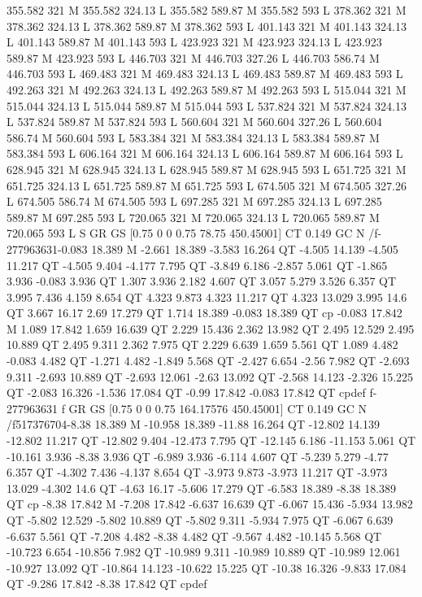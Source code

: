 355.582 321 M
355.582 324.13 L
355.582 589.87 M
355.582 593 L
378.362 321 M
378.362 324.13 L
378.362 589.87 M
378.362 593 L
401.143 321 M
401.143 324.13 L
401.143 589.87 M
401.143 593 L
423.923 321 M
423.923 324.13 L
423.923 589.87 M
423.923 593 L
446.703 321 M
446.703 327.26 L
446.703 586.74 M
446.703 593 L
469.483 321 M
469.483 324.13 L
469.483 589.87 M
469.483 593 L
492.263 321 M
492.263 324.13 L
492.263 589.87 M
492.263 593 L
515.044 321 M
515.044 324.13 L
515.044 589.87 M
515.044 593 L
537.824 321 M
537.824 324.13 L
537.824 589.87 M
537.824 593 L
560.604 321 M
560.604 327.26 L
560.604 586.74 M
560.604 593 L
583.384 321 M
583.384 324.13 L
583.384 589.87 M
583.384 593 L
606.164 321 M
606.164 324.13 L
606.164 589.87 M
606.164 593 L
628.945 321 M
628.945 324.13 L
628.945 589.87 M
628.945 593 L
651.725 321 M
651.725 324.13 L
651.725 589.87 M
651.725 593 L
674.505 321 M
674.505 327.26 L
674.505 586.74 M
674.505 593 L
697.285 321 M
697.285 324.13 L
697.285 589.87 M
697.285 593 L
720.065 321 M
720.065 324.13 L
720.065 589.87 M
720.065 593 L
S
GR
GS
[0.75 0 0 0.75 78.75 450.45001] CT
0.149 GC
N
/f-277963631{-0.083 18.389 M
-2.661 18.389 -3.583 16.264 QT
-4.505 14.139 -4.505 11.217 QT
-4.505 9.404 -4.177 7.795 QT
-3.849 6.186 -2.857 5.061 QT
-1.865 3.936 -0.083 3.936 QT
1.307 3.936 2.182 4.607 QT
3.057 5.279 3.526 6.357 QT
3.995 7.436 4.159 8.654 QT
4.323 9.873 4.323 11.217 QT
4.323 13.029 3.995 14.6 QT
3.667 16.17 2.69 17.279 QT
1.714 18.389 -0.083 18.389 QT
cp
-0.083 17.842 M
1.089 17.842 1.659 16.639 QT
2.229 15.436 2.362 13.982 QT
2.495 12.529 2.495 10.889 QT
2.495 9.311 2.362 7.975 QT
2.229 6.639 1.659 5.561 QT
1.089 4.482 -0.083 4.482 QT
-1.271 4.482 -1.849 5.568 QT
-2.427 6.654 -2.56 7.982 QT
-2.693 9.311 -2.693 10.889 QT
-2.693 12.061 -2.63 13.092 QT
-2.568 14.123 -2.326 15.225 QT
-2.083 16.326 -1.536 17.084 QT
-0.99 17.842 -0.083 17.842 QT
cp}def
f-277963631
f
GR
GS
[0.75 0 0 0.75 164.17576 450.45001] CT
0.149 GC
N
/f517376704{-8.38 18.389 M
-10.958 18.389 -11.88 16.264 QT
-12.802 14.139 -12.802 11.217 QT
-12.802 9.404 -12.473 7.795 QT
-12.145 6.186 -11.153 5.061 QT
-10.161 3.936 -8.38 3.936 QT
-6.989 3.936 -6.114 4.607 QT
-5.239 5.279 -4.77 6.357 QT
-4.302 7.436 -4.137 8.654 QT
-3.973 9.873 -3.973 11.217 QT
-3.973 13.029 -4.302 14.6 QT
-4.63 16.17 -5.606 17.279 QT
-6.583 18.389 -8.38 18.389 QT
cp
-8.38 17.842 M
-7.208 17.842 -6.637 16.639 QT
-6.067 15.436 -5.934 13.982 QT
-5.802 12.529 -5.802 10.889 QT
-5.802 9.311 -5.934 7.975 QT
-6.067 6.639 -6.637 5.561 QT
-7.208 4.482 -8.38 4.482 QT
-9.567 4.482 -10.145 5.568 QT
-10.723 6.654 -10.856 7.982 QT
-10.989 9.311 -10.989 10.889 QT
-10.989 12.061 -10.927 13.092 QT
-10.864 14.123 -10.622 15.225 QT
-10.38 16.326 -9.833 17.084 QT
-9.286 17.842 -8.38 17.842 QT
cp}def
